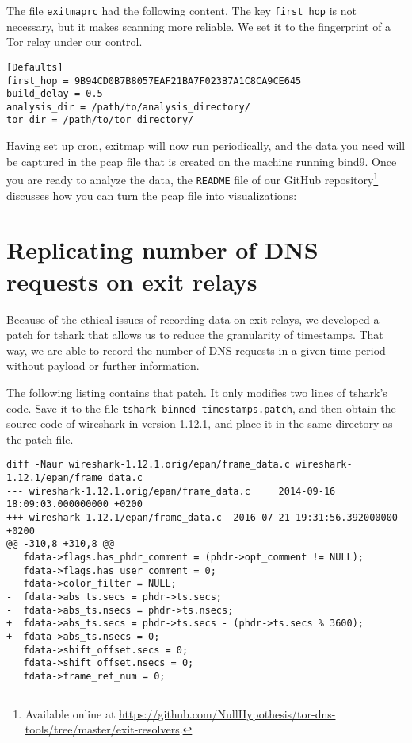 \documentclass{article}
\begin{document}
The file {\tt exitmaprc} had the following content.  The key \texttt{first\_hop}
is not necessary, but it makes scanning more reliable.  We set it to the
fingerprint of a Tor relay under our control.
\begin{lstlisting}
[Defaults]
first_hop = 9B94CD0B7B8057EAF21BA7F023B7A1C8CA9CE645
build_delay = 0.5
analysis_dir = /path/to/analysis_directory/
tor_dir = /path/to/tor_directory/
\end{lstlisting}

Having set up cron, exitmap will now run periodically, and the data you need
will be captured in the pcap file that is created on the machine running bind9.
Once you are ready to analyze the data, the {\tt README} file of our GitHub
repository\footnote{Available online at
\url{https://github.com/NullHypothesis/tor-dns-tools/tree/master/exit-resolvers}.}
discusses how you can turn the pcap file into visualizations:

\section{Replicating number of DNS requests on exit relays}
Because of the ethical issues of recording data on exit relays, we developed a
patch for tshark that allows us to reduce the granularity of timestamps.  That
way, we are able to record the number of DNS requests in a given time period
without payload or further information.

The following listing contains that patch.  It only modifies two lines of
tshark's code.  Save it to the file {\tt tshark-binned-timestamps.patch}, and
then obtain the source code of wireshark in version 1.12.1, and place it in the
same directory as the patch file.

\begin{lstlisting}
diff -Naur wireshark-1.12.1.orig/epan/frame_data.c wireshark-1.12.1/epan/frame_data.c
--- wireshark-1.12.1.orig/epan/frame_data.c     2014-09-16 18:09:03.000000000 +0200
+++ wireshark-1.12.1/epan/frame_data.c  2016-07-21 19:31:56.392000000 +0200
@@ -310,8 +310,8 @@
   fdata->flags.has_phdr_comment = (phdr->opt_comment != NULL);
   fdata->flags.has_user_comment = 0;
   fdata->color_filter = NULL;
-  fdata->abs_ts.secs = phdr->ts.secs;
-  fdata->abs_ts.nsecs = phdr->ts.nsecs;
+  fdata->abs_ts.secs = phdr->ts.secs - (phdr->ts.secs % 3600);
+  fdata->abs_ts.nsecs = 0;
   fdata->shift_offset.secs = 0;
   fdata->shift_offset.nsecs = 0;
   fdata->frame_ref_num = 0;
\end{lstlisting}
\end{document}

